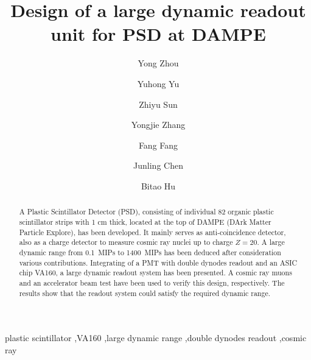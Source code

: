 \documentclass[5p, times]{elsarticle}
\begin{document}
\begin{frontmatter}

\title{Design of a large dynamic readout unit for PSD at DAMPE}

\author[imp,lzu,ucas]{Yong Zhou}

\author[imp]{Yuhong Yu}

\author[imp]{Zhiyu Sun}
\author[imp]{Yongjie Zhang}
\author[imp]{Fang Fang}
\author[imp]{Junling Chen}

\author[lzu]{Bitao Hu}

\address[imp]{Institute of Modern Physics, Chinese Academy of Sciences,  509 Nanchang Road,  Lanzhou,  730000,  P.R.China}
\address[lzu]{School of Nuclear Science and Technology,  Lanzhou University,  222 South Tianshui Road,  Lanzhou,  730000,  P.R.China}
\address[ucas]{Graduate University of the Chinese Academy of Sciences,  19A Yuquan Road,  Beijing,  100049,  P.R.China}

\begin{abstract}

A Plastic Scintillator Detector (PSD), consisting of individual 82 organic plastic scintillator strips with 1 cm thick,
located at the top of DAMPE (DArk Matter Particle Explore), has been developed. It mainly serves as anti-coincidence
detector, also as a charge detector to measure cosmic ray nuclei up to charge $Z=20$. A large dynamic range from \SI{0.1}{MIPs} to \SI{1400}{MIPs} has been deduced after consideration various contributions. Integrating of a PMT with double dynodes
readout and an ASIC chip VA160, a large dynamic readout system has been presented. A cosmic ray muons and an
accelerator beam test have been used to verify this design, respectively. The results show that the readout system
could satisfy the required dynamic range. 

\end{abstract}

\begin{keyword}
plastic scintillator
\sep VA160
\sep large dynamic range
\sep double dynodes readout
\sep cosmic ray

\end{keyword}

\end{frontmatter}

\linenumbers
\end{document}
